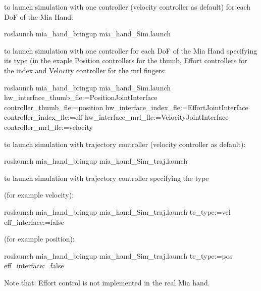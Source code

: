 \begin{DoxyItemize}
\item to launch simulation with one controller (velocity controller as default) for each DoF of the Mia Hand\+: \begin{DoxyVerb}roslaunch mia_hand_bringup mia_hand_Sim.launch
\end{DoxyVerb}

\item to launch simulation with one controller for each DoF of the Mia Hand specifying its type (in the exaple Position controllers for the thumb, Effort controllers for the index and Velocity controller for the mrl fingers\+: \begin{DoxyVerb}roslaunch mia_hand_bringup mia_hand_Sim.launch hw_interface_thumb_fle:=PositionJointInterface controller_thumb_fle:=position hw_interface_index_fle:=EffortJointInterface controller_index_fle:=eff hw_interface_mrl_fle:=VelocityJointInterface controller_mrl_fle:=velocity
\end{DoxyVerb}

\item to launch simulation with trajectory controller (velocity controller as default)\+: \begin{DoxyVerb} roslaunch mia_hand_bringup mia_hand_Sim_traj.launch
\end{DoxyVerb}

\item to launch simulation with trajectory controller specifying the type
\begin{DoxyItemize}
\item (for example velocity)\+: \begin{DoxyVerb}roslaunch mia_hand_bringup mia_hand_Sim_traj.launch tc_type:=vel eff_interface:=false
\end{DoxyVerb}

\item (for example position)\+: \begin{DoxyVerb}roslaunch mia_hand_bringup mia_hand_Sim_traj.launch tc_type:=pos eff_interface:=false
\end{DoxyVerb}

\item Note that\+: Effort control is not implemented in the real Mia hand. 
\end{DoxyItemize}
\end{DoxyItemize}